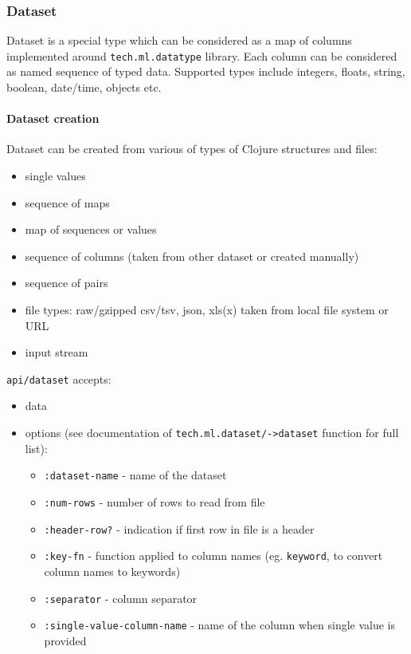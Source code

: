 \documentclass[]{article}
\providecommand{\tightlist}{%
  \setlength{\itemsep}{0pt}\setlength{\parskip}{0pt}}
\let\oldparagraph\paragraph
\renewcommand{\paragraph}[1]{\oldparagraph{#1}\mbox{}}
\begin{document}
\subsubsection{Dataset}\label{dataset}

Dataset is a special type which can be considered as a map of columns
implemented around \texttt{tech.ml.datatype} library. Each column can be
considered as named sequence of typed data. Supported types include
integers, floats, string, boolean, date/time, objects etc.

\paragraph{Dataset creation}\label{dataset-creation}

Dataset can be created from various of types of Clojure structures and
files:

\begin{itemize}
\tightlist
\item
  single values
\item
  sequence of maps
\item
  map of sequences or values
\item
  sequence of columns (taken from other dataset or created manually)
\item
  sequence of pairs
\item
  file types: raw/gzipped csv/tsv, json, xls(x) taken from local file
  system or URL
\item
  input stream
\end{itemize}

\texttt{api/dataset} accepts:

\begin{itemize}
\tightlist
\item
  data
\item
  options (see documentation of
  \texttt{tech.ml.dataset/-\textgreater{}dataset} function for full
  list):

  \begin{itemize}
  \tightlist
  \item
    \texttt{:dataset-name} - name of the dataset
  \item
    \texttt{:num-rows} - number of rows to read from file
  \item
    \texttt{:header-row?} - indication if first row in file is a header
  \item
    \texttt{:key-fn} - function applied to column names (eg.
    \texttt{keyword}, to convert column names to keywords)
  \item
    \texttt{:separator} - column separator
  \item
    \texttt{:single-value-column-name} - name of the column when single
    value is provided
  \end{itemize}
\end{itemize}
\end{document}
